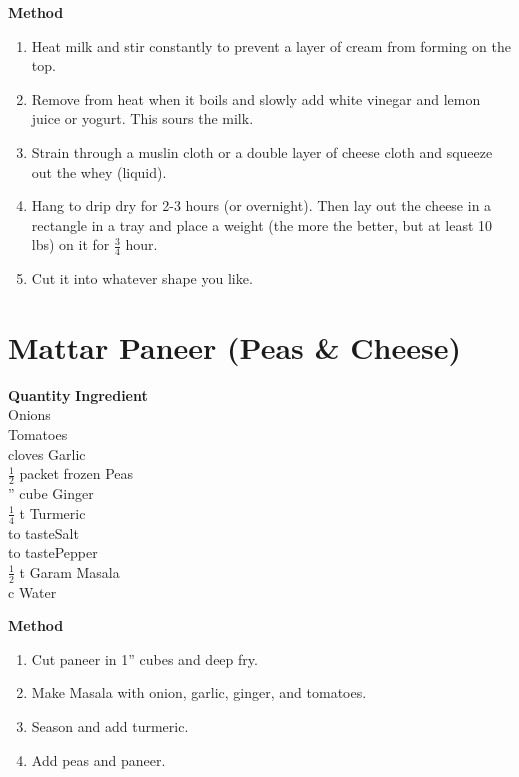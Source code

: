 {\bf Method}
\begin{enumerate}
\item Heat milk and stir constantly to prevent a layer of cream from forming on the top.
\item Remove from heat when it boils and slowly add white vinegar and lemon
juice or yogurt.  This sours the milk.
\item Strain through a muslin cloth or a double layer of cheese cloth and
squeeze out the whey (liquid). 
\item Hang to drip dry for 2-3 hours (or overnight).  Then lay out the
cheese in a rectangle in a tray and place a weight (the more the better,
but at least 10 lbs) on it for $\frac{3}{4}$ hour.  
\item Cut it into whatever shape you like.
\end{enumerate}

\section{Mattar Paneer (Peas \& Cheese)}

\begin{tabbing}
\hspace{1.0cm}  \={\bf Quantity}   \hspace{3.0cm} \={\bf Ingredient}\\
 \>Onions    \\
 \>Tomatoes\\
 cloves \>Garlic             \\
\>$\frac{1}{2}$ packet frozen \>Peas\\
'' cube\> Ginger              \\
\>$\frac{1}{4}$ t \>Turmeric\\
\>to taste\>Salt \\
\>to taste\>Pepper              \\
\>$\frac{1}{2}$ t \>Garam Masala\\
 c \>Water\\
\end{tabbing}

{\bf Method}
\begin{enumerate}
\item Cut paneer in 1'' cubes and deep fry.
\item Make Masala with onion, garlic, ginger, and tomatoes.
\item Season and add turmeric.
\item Add peas and paneer.
\end{enumerate}

